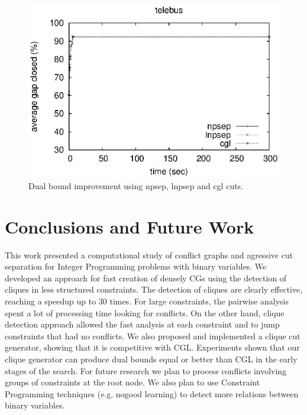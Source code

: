 \documentclass{endm}
\begin{document}
\begin{figure}
\begin{minipage}[h]{.5\textwidth}
\begin{center}
			\includegraphics[width=1.\textwidth]{telebus.eps}
		\end{center}
	\end{minipage}
	\caption{Dual bound improvement using npsep, lnpsep and cgl cuts.}
	\label{figExperiments}
\end{figure}

\section{Conclusions and Future Work}\label{conclusions}

This work presented a computational study of conflict graphs and agressive cut separation for Integer Programming problems with binary variables. We developed an approach for fast creation of densely CGs using the detection of cliques in less structured constraints. The detection of cliques are clearly effective, reaching a speedup up to 30 times. For large constraints, the pairwise analysis spent a lot of processing time looking for conflicts. On the other hand, clique detection approach allowed the fast analysis at each constraint and to jump constraints that had no conflicts. We also proposed and implemented a clique cut generator, showing that it is competitive with CGL. Experiments shown that our clique generator can produce dual bounds equal or better than CGL in the early stages of the search. For future research we plan to process conflicts involving groups of constraints at the root node. We also plan to use Constraint Programming techniques (e.g. nogood learning) to detect more relations between binary variables.



\end{document}
